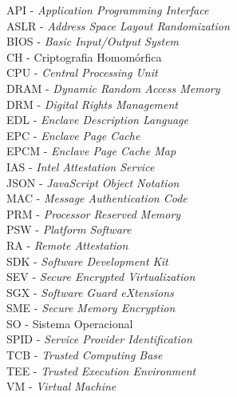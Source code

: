 API - \textit{Application Programming Interface} \\
ASLR - \textit{Address Space Layout Randomization} \\
BIOS - \textit{Basic Input/Output System} \\
CH - Criptografia Homomórfica \\
CPU - \textit{Central Processing Unit} \\
DRAM - \textit{Dynamic Random Access Memory} \\
DRM - \textit{Digital Rights Management} \\
EDL - \textit{Enclave Description Language} \\
EPC - \textit{Enclave Page Cache} \\
EPCM - \textit{Enclave Page Cache Map} \\
IAS - \textit{Intel Attestation Service} \\
JSON - \textit{JavaScript Object Notation} \\
MAC - \textit{Message Authentication Code} \\
PRM - \textit{Processor Reserved Memory} \\
PSW - \textit{Platform Software} \\
RA - \textit{Remote Attestation} \\
SDK - \textit{Software Development Kit} \\
SEV - \textit{Secure Encrypted Virtualization} \\
SGX - \textit{Software Guard eXtensions} \\
SME - \textit{Secure Memory Encryption} \\
SO - Sistema Operacional \\
SPID - \textit{Service Provider Identification} \\
TCB - \textit{Trusted Computing Base} \\
TEE - \textit{Trusted Execution Environment} \\
VM - \textit{Virtual Machine}